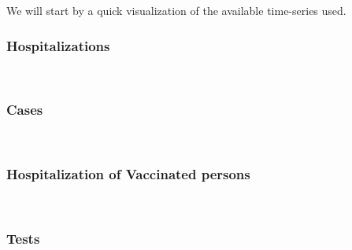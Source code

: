 \documentclass[11pt]{article}
\begin{document}
We will start by a quick visualization of the available time-series used.

    \hypertarget{hospitalizations}{%
\subsubsection{Hospitalizations}\label{hospitalizations}}

    \begin{center}
    \end{center}
    { \hspace*{\fill} \\}
    
    \hypertarget{cases}{%
\subsubsection{Cases}\label{cases}}

    \begin{center}
    \end{center}
    { \hspace*{\fill} \\}
    
    \hypertarget{hospitalization-of-vaccinated-persons}{%
\subsubsection{Hospitalization of Vaccinated
persons}\label{hospitalization-of-vaccinated-persons}}

    \begin{center}
    \end{center}
    { \hspace*{\fill} \\}
    
    \hypertarget{tests}{%
\subsubsection{Tests}\label{tests}}

    \begin{center}
    \end{center}
    { \hspace*{\fill} \\}
    
\end{document}

